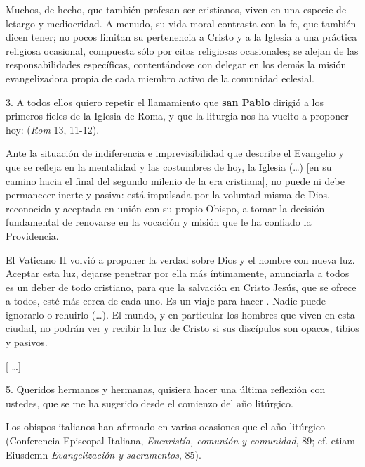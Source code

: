 \begin{body}
	Muchos, de hecho, que también profesan ser cristianos, viven en una especie de letargo y mediocridad. A menudo, su vida moral contrasta con la fe, que también dicen tener; no pocos limitan su pertenencia a Cristo y a la Iglesia a una práctica religiosa ocasional, compuesta sólo por citas religiosas ocasionales; se alejan de las responsabilidades específicas, contentándose con delegar en los demás la misión evangelizadora propia de cada miembro activo de la comunidad eclesial. 
	
	3. A todos ellos quiero repetir el llamamiento que \textbf{san Pablo} dirigió a los primeros fieles de la Iglesia de Roma, y que la liturgia nos ha vuelto a proponer hoy:  (\emph{Rom} 13, 11-12). 
	
	Ante la situación de indiferencia e imprevisibilidad que describe el Evangelio y que se refleja en la mentalidad y las costumbres de hoy, la Iglesia (\ldots{}) {[}en su camino hacia el final del segundo milenio de la era cristiana{]}, no puede ni debe permanecer inerte y pasiva: está impulsada por la voluntad misma de Dios, reconocida y aceptada en unión con su propio Obispo, a tomar la decisión fundamental de renovarse en la vocación y misión que le ha confiado la Providencia. 
	
	El Vaticano II volvió a proponer la verdad sobre Dios y el hombre con nueva luz. Aceptar esta luz, dejarse penetrar por ella más íntimamente, anunciarla a todos es un deber de todo cristiano, para que la salvación en Cristo Jesús, que se ofrece a todos, esté más cerca de cada uno. Es un viaje para hacer . Nadie puede ignorarlo o rehuirlo (\ldots{}). El mundo, y en particular los hombres que viven en esta ciudad, no podrán ver y recibir la luz de Cristo si sus discípulos son opacos, tibios y pasivos. 
	
	{[} \ldots{}{]} 
	
	5. Queridos hermanos y hermanas, quisiera hacer una última reflexión con ustedes, que se me ha sugerido desde el comienzo del año litúrgico.  
	
	Los obispos italianos han afirmado en varias ocasiones que el año litúrgico  (Conferencia Episcopal Italiana, \emph{Eucaristía, comunión y comunidad}, 89; cf. etiam Eiusdemn \emph{Evangelización y sacramentos}, 85). 
	

\end{body}
